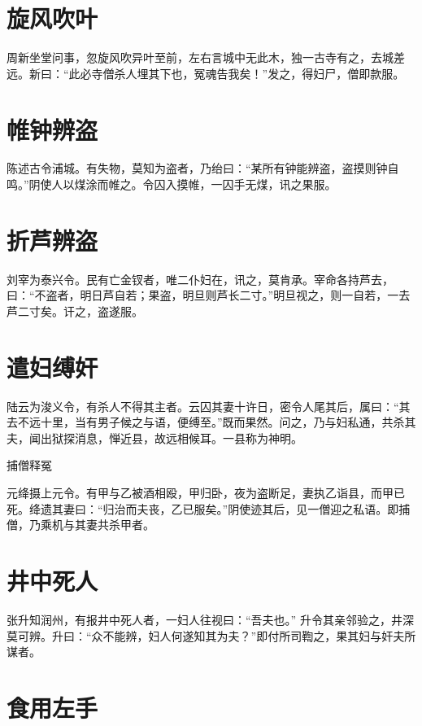 \documentclass[a4paper,12pt,UTF8,twoside]{ctexbook}
\begin{document}
    \section{旋风吹叶}
    
    周新坐堂问事，忽旋风吹异叶至前，左右言城中无此木，独一古寺有之，去城差远。新曰：“此必寺僧杀人埋其下也，冤魂告我矣！”发之，得妇尸，僧即款服。
    
    \section{帷钟辨盗}
    
    陈述古令浦城。有失物，莫知为盗者，乃绐曰：“某所有钟能辨盗，盗摸则钟自鸣。”阴使人以煤涂而帷之。令囚入摸帷，一囚手无煤，讯之果服。
    
    \section{折芦辨盗}
    
    刘宰为泰兴令。民有亡金钗者，唯二仆妇在，讯之，莫肯承。宰命各持芦去，曰：“不盗者，明日芦自若；果盗，明旦则芦长二寸。”明旦视之，则一自若，一去芦二寸矣。讦之，盗遂服。
    
    \section{遣妇缚奸}
    
    陆云为浚义令，有杀人不得其主者。云囚其妻十许日，密令人尾其后，属曰：“其去不远十里，当有男子候之与语，便缚至。”既而果然。问之，乃与妇私通，共杀其夫，闻出狱探消息，惮近县，故远相候耳。一县称为神明。
    
    捕僧释冤
    
    元绛摄上元令。有甲与乙被酒相殴，甲归卧，夜为盗断足，妻执乙诣县，而甲已死。绛遗其妻曰：“归治而夫丧，乙已服矣。”阴使迹其后，见一僧迎之私语。即捕僧，乃乘机与其妻共杀甲者。
    
    \section{井中死人}
    
    张升知润州，有报井中死人者，一妇人往视曰：“吾夫也。” 升令其亲邻验之，井深莫可辨。升曰：“众不能辨，妇人何遂知其为夫？”即付所司鞫之，果其妇与奸夫所谋者。
    
    \section{食用左手}
    
\end{document}
